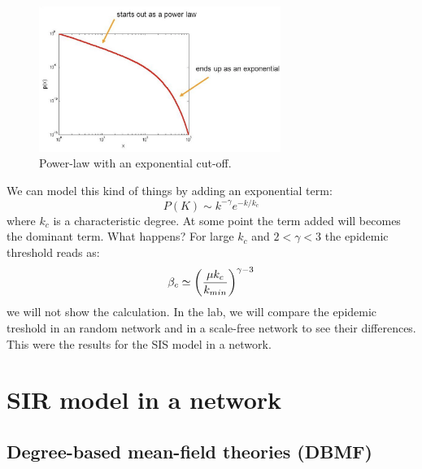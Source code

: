 \documentclass[../main/main.tex]{subfiles}
\begin{document}
\begin{figure}[h!]
\centering
\includegraphics[width=0.7\textwidth]{../lessons/image/07/2.png}
\caption{\label{fig:07_2} Power-law with an exponential cut-off.}
\end{figure}


We can model this kind of things by adding an exponential term:
 \begin{equation}
   P(K) \sim k^{- \gamma}   e^{-k/k_c}
 \end{equation}
where \( k_c \) is a characteristic degree.
At some point the term added will becomes the dominant term. What happens? For large \( k_c \) and \( 2 < \gamma < 3  \) the epidemic threshold reads as:
\begin{equation}
  \beta _c \simeq \qty(\frac{\mu k_c}{k_{min}})^{\gamma -3 }
\end{equation}
we will not show the calculation. In the lab, we will compare the epidemic treshold in an random network and in a scale-free network to see their differences. This were the results for the SIS model in a network.






\section{SIR model in a network}

\subsection{Degree-based mean-field theories (DBMF)}
\end{document}
